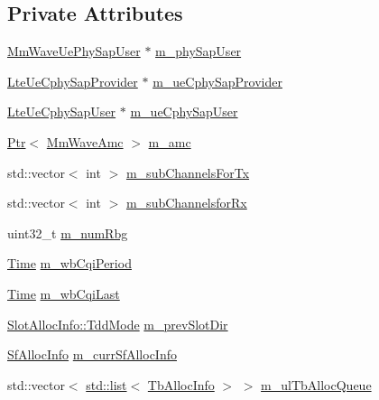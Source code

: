 \subsection*{Private Attributes}
\begin{DoxyCompactItemize}
\item 
\hyperlink{classns3_1_1MmWaveUePhySapUser}{Mm\+Wave\+Ue\+Phy\+Sap\+User} $\ast$ \hyperlink{classns3_1_1MmWaveUePhy_ada28b24f0029ea9fbe7e02f1fb9c918e}{m\+\_\+phy\+Sap\+User}
\item 
\hyperlink{classns3_1_1LteUeCphySapProvider}{Lte\+Ue\+Cphy\+Sap\+Provider} $\ast$ \hyperlink{classns3_1_1MmWaveUePhy_ad2ece095b0e0d188779c686a4359be61}{m\+\_\+ue\+Cphy\+Sap\+Provider}
\item 
\hyperlink{classns3_1_1LteUeCphySapUser}{Lte\+Ue\+Cphy\+Sap\+User} $\ast$ \hyperlink{classns3_1_1MmWaveUePhy_a32f5b517417dafeb41ec4cd7d24069f1}{m\+\_\+ue\+Cphy\+Sap\+User}
\item 
\hyperlink{classns3_1_1Ptr}{Ptr}$<$ \hyperlink{classns3_1_1MmWaveAmc}{Mm\+Wave\+Amc} $>$ \hyperlink{classns3_1_1MmWaveUePhy_a141a0292d9466b2a14baaf07df937e50}{m\+\_\+amc}
\item 
std\+::vector$<$ int $>$ \hyperlink{classns3_1_1MmWaveUePhy_ae8c5b752db04a74c6749cc2bd702a99a}{m\+\_\+sub\+Channels\+For\+Tx}
\item 
std\+::vector$<$ int $>$ \hyperlink{classns3_1_1MmWaveUePhy_a8bcc3ae6dcc33338a109f8a279f5c810}{m\+\_\+sub\+Channelsfor\+Rx}
\item 
uint32\+\_\+t \hyperlink{classns3_1_1MmWaveUePhy_a18fabebb38d14b98f7a1232fa87ea220}{m\+\_\+num\+Rbg}
\item 
\hyperlink{classns3_1_1Time}{Time} \hyperlink{classns3_1_1MmWaveUePhy_ac29bad9930696fd4f813d29585a55c8a}{m\+\_\+wb\+Cqi\+Period}
\item 
\hyperlink{classns3_1_1Time}{Time} \hyperlink{classns3_1_1MmWaveUePhy_a75eb0a8e2407b3faf54630d8ad76ddf0}{m\+\_\+wb\+Cqi\+Last}
\item 
\hyperlink{structns3_1_1SlotAllocInfo_a6cad60db1d39034f1851e2cea625fe5d}{Slot\+Alloc\+Info\+::\+Tdd\+Mode} \hyperlink{classns3_1_1MmWaveUePhy_a8ec412ead6045f762c38a86f0d0b210a}{m\+\_\+prev\+Slot\+Dir}
\item 
\hyperlink{structns3_1_1SfAllocInfo}{Sf\+Alloc\+Info} \hyperlink{classns3_1_1MmWaveUePhy_ac557b99a2b425df99cb8d827f939df90}{m\+\_\+curr\+Sf\+Alloc\+Info}
\item 
std\+::vector$<$ \hyperlink{openflow-interface_8h_afd9bcfa176617760671b67580f536fa7}{std\+::list}$<$ \hyperlink{structns3_1_1TbAllocInfo}{Tb\+Alloc\+Info} $>$ $>$ \hyperlink{classns3_1_1MmWaveUePhy_adfc5021363d72af9bcd23a64b79724df}{m\+\_\+ul\+Tb\+Alloc\+Queue}

\end{DoxyCompactItemize}
